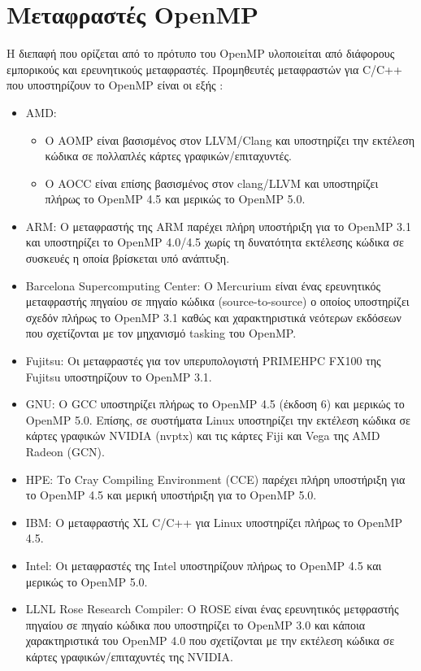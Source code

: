 \section{Μεταφραστές OpenMP}
Η διεπαφή που ορίζεται από το πρότυπο του OpenMP υλοποιείται από διάφορους εμπορικούς και ερευνητικούς μεταφραστές. Προμηθευτές μεταφραστών για C/C++ που υποστηρίζουν το OpenMP είναι οι εξής \cite{openmpcompilers,ompicompiler}:

\begin{itemize}
	\item AMD: 
	\begin{itemize}
		\item Ο AOMP είναι βασισμένος στον LLVM/Clang και υποστηρίζει την εκτέλεση κώδικα σε πολλαπλές κάρτες γραφικών/επιταχυντές.
		\item Ο AOCC είναι επίσης βασισμένος στον clang/LLVM και υποστηρίζει πλήρως το OpenMP 4.5 και μερικώς το OpenMP 5.0.
	\end{itemize}
	\item ARM: Ο μεταφραστής της ARM παρέχει πλήρη υποστήριξη για το OpenMP 3.1 και υποστηρίζει το OpenMP 4.0/4.5 χωρίς τη δυνατότητα εκτέλεσης κώδικα σε συσκευές η οποία βρίσκεται υπό ανάπτυξη.
	\item Barcelona Supercomputing Center: Ο Mercurium είναι ένας ερευνητικός μεταφραστής πηγαίου σε πηγαίο κώδικα (source-to-source) ο οποίος υποστηρίζει σχεδόν πλήρως το OpenMP 3.1 καθώς και χαρακτηριστικά νεότερων εκδόσεων που σχετίζονται με τον μηχανισμό tasking του OpenMP.
	\item Fujitsu: Οι μεταφραστές για τον υπερυπολογιστή PRIMEHPC FX100 της Fujitsu υποστηρίζουν το OpenMP 3.1.
	\item GNU: Ο GCC υποστηρίζει πλήρως το OpenMP 4.5 (έκδοση 6) και μερικώς το OpenMP 5.0. Επίσης, σε συστήματα Linux υποστηρίζει την εκτέλεση κώδικα σε κάρτες γραφικών NVIDIA (nvptx) και τις κάρτες Fiji και Vega της AMD Radeon (GCN).
	\item HPE: Το Cray Compiling Environment (CCE) παρέχει πλήρη υποστήριξη για το OpenMP 4.5 και μερική υποστήριξη για το OpenMP 5.0.
	\item IBM: Ο μεταφραστής XL C/C++ για Linux υποστηρίζει πλήρως το OpenMP 4.5.
	\item Intel: Οι μεταφραστές της Intel υποστηρίζουν πλήρως το OpenMP 4.5 και μερικώς το OpenMP 5.0.
	\item LLNL Rose Research Compiler: Ο ROSE είναι ένας ερευνητικός μετφραστής πηγαίου σε πηγαίο κώδικα που υποστηρίζει το OpenMP 3.0 και κάποια χαρακτηριστικά του OpenMP 4.0 που σχετίζονται με την εκτέλεση κώδικα σε κάρτες γραφικών/επιταχυντές της NVIDIA.

\end{itemize}
